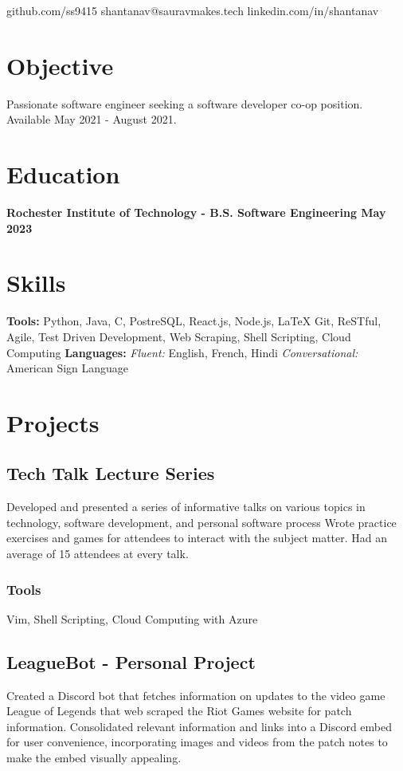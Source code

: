 \documentclass[11pt, letterpaper]{article}
\makeatletter
\renewcommand{\maketitle} {
    \thispagestyle{empty}
    \begin{center}    
        {\huge\bfseries \theauthor}

        \vspace{.5em}

        \quad \quad \quad \quad
        \faGithub \quad github.com/ss9415 \quad 
        \Letter \quad  shantanav@sauravmakes.tech \quad
        \faLinkedin \quad linkedin.com/in/shantanav \quad  

    \end{center}
}
\makeatother
\begin{document}
    \author{Shantanav Saurav}
    \maketitle

    \section{Objective}
        Passionate software engineer seeking a software developer co-op position. 
        Available May 2021 - August 2021.
    \section{Education}
        \textbf{Rochester Institute of Technology - B.S. Software Engineering \hfill May 2023}

    \section{Skills}
        \textbf{Tools:}
            Python, Java, C, PostreSQL, React.js, Node.js, LaTeX Git, ReSTful, Agile,
            Test Driven Development, Web Scraping, Shell Scripting, Cloud Computing \newline
        \textbf{Languages:}
            \emph{Fluent:} English, French, Hindi 
            \emph{Conversational:} American Sign Language

    \section{Projects}
        \subsection{Tech Talk Lecture Series}
            Developed and presented a series of informative talks on various topics in technology, software 
            development, and personal software process Wrote practice exercises and games for attendees to 
            interact with the subject matter. Had an average of 15 attendees at every talk.
            \subsubsection{Tools}
                Vim, Shell Scripting, Cloud Computing with Azure

        \subsection{LeagueBot - Personal Project}
            Created a Discord bot that fetches information on updates to the video game League of Legends 
            that web scraped the Riot Games website for patch information. Consolidated relevant information 
            and links into a Discord embed for user convenience, incorporating images and videos from the 
            patch notes to make the embed visually appealing.
\end{document}
